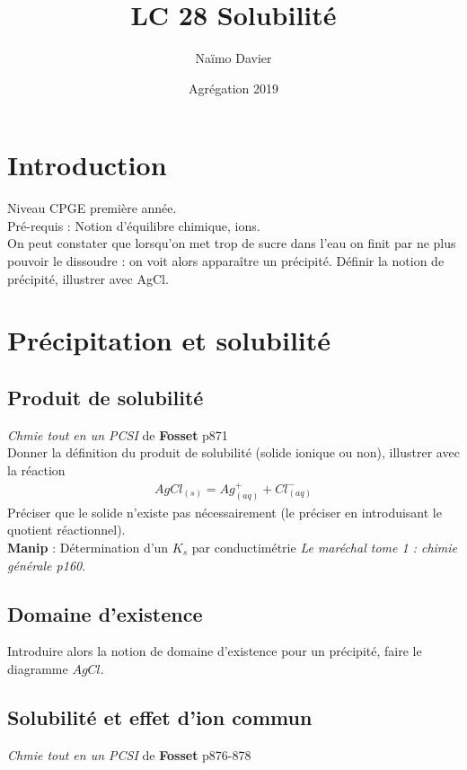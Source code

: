 \documentclass[12pt,prb,aps,epsf]{article}
\begin{document}
	
	\title{LC 28 Solubilité}
	\author{Naïmo Davier}
	\date{Agrégation 2019}
	\maketitle
	
	\tableofcontents
	
	\pagebreak
	
	
\section{Introduction}
Niveau CPGE première année.\\

Pré-requis : Notion d'équilibre chimique, ions.\\

On peut constater que lorsqu'on met trop de sucre dans l'eau on finit par ne plus pouvoir le dissoudre : on voit alors apparaître un précipité.
Définir la notion de précipité, illustrer avec AgCl.

\section{Précipitation et solubilité}
\subsection{Produit de solubilité}
\textit{Chmie tout en un PCSI} de \textbf{Fosset} p871\\

Donner la définition du produit de solubilité (solide ionique ou non), illustrer avec la réaction 
\begin{eqnarray}
AgCl_{(s)} = Ag^+_{(aq)} + Cl^-_{(aq)}
\end{eqnarray}
Préciser que le solide n'existe pas nécessairement (le préciser en introduisant le quotient réactionnel).\\

\textbf{Manip} : Détermination d'un $K_s$ par conductimétrie \textit{Le maréchal tome 1 : chimie générale p160}.

\subsection{Domaine d'existence}

Introduire alors la notion de domaine d'existence pour un précipité, faire le diagramme $AgCl$.

\subsection{Solubilité et effet d'ion commun}
\textit{Chmie tout en un PCSI} de \textbf{Fosset} p876-878\\
\end{document}
